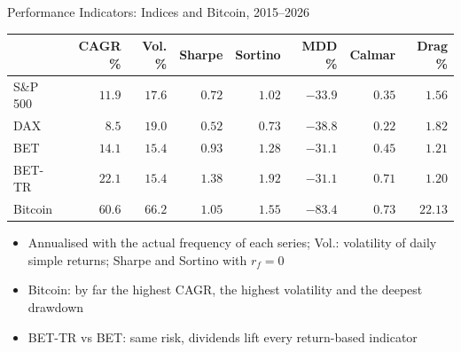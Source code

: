 \begin{frame}{Performance Indicators: Indices and Bitcoin, 2015--2026}
\itemsize{\small}
\begin{center}
\footnotesize
\begin{tabular}{lrrrrrrr}
\toprule
& CAGR \% & Vol. \% & Sharpe & Sortino & MDD \% & Calmar & Drag \% \\
\midrule
S\&P 500 & $11.9$ & $17.6$ & $0.72$ & $1.02$ & $-33.9$ & $0.35$ & $1.56$ \\
DAX & $8.5$ & $19.0$ & $0.52$ & $0.73$ & $-38.8$ & $0.22$ & $1.82$ \\
BET & $14.1$ & $15.4$ & $0.93$ & $1.28$ & $-31.1$ & $0.45$ & $1.21$ \\
BET-TR & $22.1$ & $15.4$ & $1.38$ & $1.92$ & $-31.1$ & $0.71$ & $1.20$ \\
Bitcoin & $60.6$ & $66.2$ & $1.05$ & $1.55$ & $-83.4$ & $0.73$ & $22.13$ \\
\bottomrule
\end{tabular}
\end{center}
\begin{itemize}
    \item Annualised with the actual frequency of each series; Vol.: volatility of daily simple returns; Sharpe and Sortino with $r_f = 0$
    \item Bitcoin: by far the highest CAGR, the highest volatility and the deepest drawdown
    \item BET-TR vs BET: same risk, dividends lift every return-based indicator
\end{itemize}
\end{frame}

